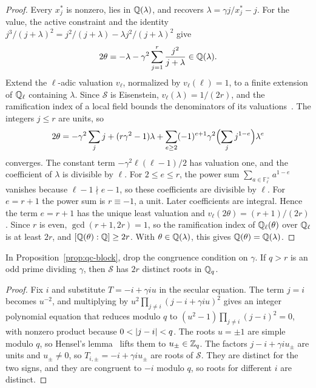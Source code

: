 \begin{proof}
Every $x_j^*$ is nonzero, lies in $\mathbb Q(\lambda)$, and recovers
$\lambda=\gamma j/x_j^*-j$. For the value, the active constraint and the
identity $j^3/(j+\lambda)^2=j^2/(j+\lambda)-\lambda j^2/(j+\lambda)^2$ give
\begin{equation}
\label{eq:qc-block-value}
2\theta=-\lambda-\gamma^2\sum_{j=1}^r\frac{j^2}{j+\lambda}\in\mathbb Q(\lambda).
\end{equation}
Extend the $\ell$-adic valuation $v_\ell$, normalized by $v_\ell(\ell)=1$, to
a finite extension of $\mathbb Q_\ell$ containing $\lambda$. Since $\mathcal S$ is
Eisenstein, $v_\ell(\lambda)=1/(2r)$, and the ramification index of a local
field bounds the denominators of its valuations~\cite{Neukirch1999}. The
integers $j\le r$ are units, so
\[
2\theta=-\gamma^2\sum_jj+(r\gamma^2-1)\lambda
+\sum_{e\ge2}(-1)^{e+1}\gamma^2\Bigl(\sum_jj^{1-e}\Bigr)\lambda^e
\]
converges. The constant term $-\gamma^2\ell(\ell-1)/2$ has valuation one, and
the coefficient of $\lambda$ is divisible by $\ell$. For $2\le e\le r$, the
power sum $\sum_{a\in\mathbb F_\ell^\times}a^{1-e}$ vanishes because
$\ell-1\nmid e-1$, so these coefficients are divisible by $\ell$. For $e=r+1$
the power sum is $r\equiv-1$, a unit. Later coefficients are integral. Hence
the term $e=r+1$ has the unique least valuation and
$v_\ell(2\theta)=(r+1)/(2r)$. Since $r$ is even, $\gcd(r+1,2r)=1$, so the
ramification index of $\mathbb Q_\ell(\theta)$ over $\mathbb Q_\ell$ is at least $2r$, and
$[\mathbb Q(\theta):\mathbb Q]\ge2r$. With $\theta\in\mathbb Q(\lambda)$, this gives
$\mathbb Q(\theta)=\mathbb Q(\lambda)$.
\end{proof}

\begin{lemma}
\label{lem:qc-split}
In Proposition~\ref{prop:qc-block}, drop the congruence condition on
$\gamma$. If $q>r$ is an odd prime dividing $\gamma$, then $\mathcal S$ has
$2r$ distinct roots in $\mathbb Q_q$.
\end{lemma}

\begin{proof}
Fix $i$ and substitute $T=-i+\gamma iu$ in the secular equation. The term
$j=i$ becomes $u^{-2}$, and multiplying by $u^2\prod_{j\ne i}(j-i+\gamma iu)^2$
gives an integer polynomial equation that reduces modulo $q$ to
$(u^2-1)\prod_{j\ne i}(j-i)^2=0$, with nonzero product because
$0<\left\lvert j-i\right\rvert<q$. The roots $u=\pm1$ are simple modulo $q$, so Hensel's
lemma~\cite{Neukirch1999} lifts them to $u_\pm\in\mathbb Z_q$. The factors $j-i+\gamma iu_\pm$ are units and
$u_\pm\ne0$, so $T_{i,\pm}=-i+\gamma iu_\pm$ are roots of $\mathcal S$. They
are distinct for the two signs, and they are congruent to $-i$ modulo $q$, so
roots for different $i$ are distinct.
\end{proof}

